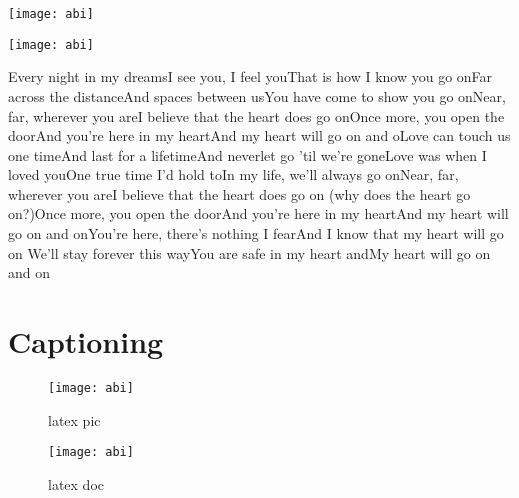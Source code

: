 \documentclass[12pt]{report}
\begin{document}
\vspace{1cm}

\centering
\texttt{[image: abi]}

\begin{center}
\texttt{[image: abi]}
\end{center}

Every night in my dreamsI see you, I feel youThat is how I know you go onFar across the distanceAnd spaces between usYou have come to show you go onNear, far, wherever you areI believe that the heart does go onOnce more, you open the doorAnd you're here in my heartAnd my heart will go on and oLove can touch us one timeAnd last for a lifetimeAnd neverlet go 'til we're goneLove was when I loved youOne true time I'd hold toIn my life, we'll always go onNear, far, wherever you areI believe that the heart does go on (why does the heart go on?)Once more, you open the doorAnd you're here in my heartAnd my heart will go on and onYou're here, there's nothing I fearAnd I know that my heart will go on We'll stay forever this wayYou are safe in my heart andMy heart will go on and on

\section{Captioning}
\begin{figure}[H]
\centering
\texttt{[image: abi]}
\caption{latex pic}
\end{figure}


\begin{wrapfigure}{r}{0.25\textwidth}
\texttt{[image: abi]}
\caption{latex doc}
\end{wrapfigure}
\end{document}
